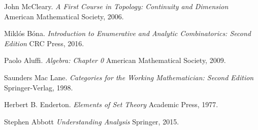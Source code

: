 \newpage

\begin{thebibliography}{9}

John McCleary.
\textit{A First Course in Topology: Continuity and Dimension}
American Mathematical Society, 2006.

Mikl\'os B\'ona.
\textit{Introduction to Enumerative and Analytic Combinatorics: Second Edition}
CRC Press, 2016.

Paolo Aluffi.
\textit{Algebra: Chapter 0}
American Mathematical Society, 2009.

Saunders Mac Lane.
\textit{Categories for the Working Mathematician: Second Edition}
Springer-Verlag, 1998.

Herbert B. Enderton.
\textit{Elements of Set Theory}
Academic Press, 1977.

Stephen Abbott
\textit{Understanding Analysis}
Springer, 2015.
\end{thebibliography}